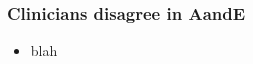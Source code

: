

\begin{frame}
	\frametitle{Clinicians disagree in AandE}
	\begin{itemize}
		\item blah
	\end{itemize}
\end{frame}